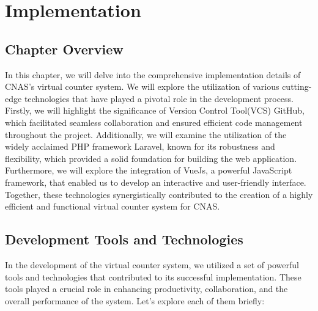 \chapter{Implementation}
\section{Chapter Overview}
In this chapter, we will delve into the comprehensive implementation details of CNAS's virtual counter system. We will explore the utilization of various cutting-edge technologies that have played a pivotal role in the development process. Firstly, we will highlight the significance of Version Control Tool(VCS) GitHub, which facilitated seamless collaboration and ensured efficient code management throughout the project. Additionally, we will examine the utilization of the widely acclaimed PHP framework Laravel, known for its robustness and flexibility, which provided a solid foundation for building the web application. Furthermore, we will explore the integration of VueJs, a powerful JavaScript framework, that enabled us to develop an interactive and user-friendly interface. Together, these technologies synergistically contributed to the creation of a highly efficient and functional virtual counter system for CNAS.
\section{Development Tools and Technologies}
In the development of the virtual counter system, we utilized a set of powerful tools and technologies that contributed to its successful implementation. These tools played a crucial role in enhancing productivity, collaboration, and the overall performance of the system. Let's explore each of them briefly:

